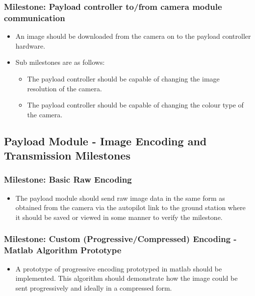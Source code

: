 	\subsubsection{Milestone: Payload controller to/from camera module communication}
		\begin{itemize}
			\item 	An image should be downloaded from the camera on to the 
				payload controller hardware.
			\item 	Sub milestones are as follows:
			\begin{itemize}
				\item The payload controller should be capable of changing the
					image resolution of the camera.
				\item The payload controller should be capable of changing the
					colour type of the camera.
			\end{itemize}
		\end{itemize}


\subsection{Payload Module - Image Encoding and Transmission Milestones}
	\subsubsection{Milestone: Basic Raw Encoding}
		\label{sec:ms_init_basic_raw_encoding}
		\begin{itemize}
			\item 	The payload module should send raw image data in the same form as 
				obtained from the camera via the autopilot link
				to the ground station where it should be saved or viewed in some manner
				to verify the milestone.
		\end{itemize}

	\subsubsection{Milestone: Custom (Progressive/Compressed) Encoding - Matlab Algorithm Prototype}
		\label{sec:ms_init_custom_enc_matlab}
		\begin{itemize}
			\item 	A prototype of progressive encoding prototyped in matlab
				should be implemented. This algorithm should demonstrate how the image
				could be sent progressively and ideally in a compressed form.
		\end{itemize}


